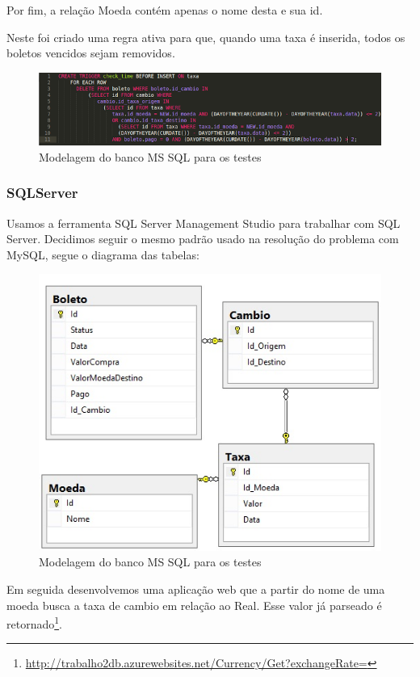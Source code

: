 \documentclass[conference]{IEEEtran}
\begin{document}
    Por fim, a relação Moeda contém apenas o nome desta e sua id.

    Neste foi criado uma regra ativa para que, quando uma taxa é inserida, todos os boletos vencidos sejam removidos.

    \begin{figure}[!t]
      \centering
      \includegraphics[scale=0.40]{img/trigger-mysql.png}
      \caption{Modelagem do banco MS SQL para os testes}
    \end{figure}

    \subsubsection{SQLServer}
  	Usamos a ferramenta SQL Server Management Studio para trabalhar com SQL Server.			
  	Decidimos seguir o mesmo padrão usado na resolução do problema com MySQL, segue o diagrama das tabelas:
   
    \begin{figure}[!t]
      \centering
      \includegraphics[scale=0.65]{img/tabela.jpg}
      \caption{Modelagem do banco MS SQL para os testes}
    \end{figure}

  	Em seguida desenvolvemos uma aplicação web que a partir do nome de uma moeda busca a taxa de cambio em relação ao Real. Esse valor já parseado é retornado\footnote{\href{http://trabalho2db.azurewebsites.net/Currency/Get?exchangeRate=}{http://trabalho2db.azurewebsites.net/Currency/Get?exchangeRate=}}.
\end{document}
